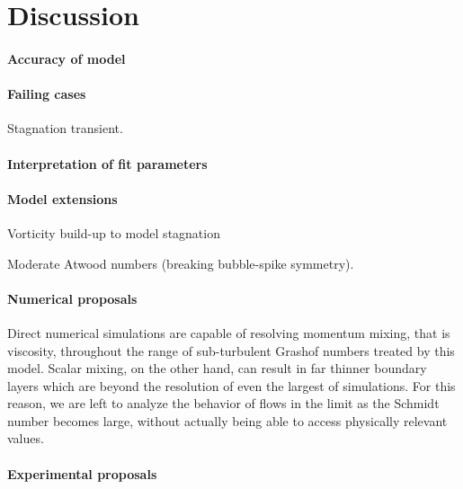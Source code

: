 \section{Discussion} 

\paragraph{Accuracy of model}

\paragraph{Failing cases}
Stagnation transient.


\paragraph{Interpretation of fit parameters}

\paragraph{Model extensions}
Vorticity build-up to model stagnation

Moderate Atwood numbers (breaking bubble-spike symmetry).

\paragraph{Numerical proposals}
Direct numerical simulations are capable of resolving momentum mixing, that is viscosity, throughout the range of sub-turbulent Grashof numbers treated by this model.
Scalar mixing, on the other hand, can result in far thinner boundary layers which are beyond the resolution of even the largest of simulations.
For this reason, we are left to analyze the behavior of flows in the limit as the Schmidt number becomes large, without actually being able to access physically relevant values.




\paragraph{Experimental proposals}

